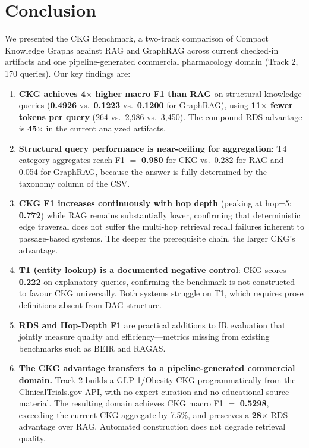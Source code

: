 \section{Conclusion}\label{sec:conclusion}

We presented the CKG Benchmark, a two-track comparison of Compact
Knowledge Graphs against RAG and GraphRAG across current checked-in
artifacts and one pipeline-generated commercial pharmacology domain
(Track 2, 170 queries). Our key findings are:

\begin{enumerate}
  \item \textbf{CKG achieves 4$\times$ higher macro F1 than RAG} on
    structural knowledge queries (\textbf{0.4926} vs.\ \textbf{0.1223}
    vs.\ \textbf{0.1200} for GraphRAG), using \textbf{11$\times$ fewer
    tokens per query} (264 vs.\ 2,986 vs.\ 3,450). The compound RDS
    advantage is \textbf{45$\times$} in the current analyzed artifacts.
  \item \textbf{Structural query performance is near-ceiling for
    aggregation}: T4 category aggregates reach F1 $=$ \textbf{0.980}
    for CKG vs.\ 0.282 for RAG and 0.054 for GraphRAG, because the
    answer is fully determined by the taxonomy column of the CSV.
  \item \textbf{CKG F1 increases continuously with hop depth} (peaking at
    hop=5: \textbf{0.772}) while RAG remains substantially lower,
    confirming that deterministic edge traversal does not suffer the
    multi-hop retrieval recall failures inherent to passage-based systems.
    The deeper the prerequisite chain, the larger CKG's advantage.
  \item \textbf{T1 (entity lookup) is a documented negative control}:
    CKG scores \textbf{0.222} on explanatory queries, confirming the
    benchmark is not constructed to favour CKG universally. Both
    systems struggle on T1, which requires prose definitions absent
    from DAG structure.
  \item \textbf{RDS and Hop-Depth F1} are practical additions to IR
    evaluation that jointly measure quality and efficiency---metrics
    missing from existing benchmarks such as BEIR and RAGAS.
  \item \textbf{The CKG advantage transfers to a pipeline-generated
    commercial domain.} Track 2 builds a GLP-1/Obesity CKG
    programmatically from the ClinicalTrials.gov API, with no expert
    curation and no educational source material. The resulting domain
    achieves CKG macro F1 $=$ \textbf{0.5298}, exceeding the current
    CKG aggregate by 7.5\%, and preserves a \textbf{28$\times$}
    RDS advantage over RAG. Automated construction does not degrade
    retrieval quality.
\end{enumerate}

